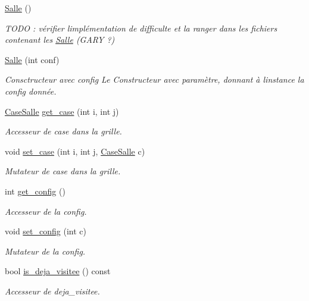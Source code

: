 \begin{DoxyCompactItemize}
\item 
\hyperlink{classSalle_a4cb05b76fb2b5430ac2bf903b8f75906}{Salle} ()
\begin{DoxyCompactList}\small\item\em T\+O\+DO \+: vérifier l\textquotesingle{}implémentation de difficulte et la ranger dans les fichiers contenant les \hyperlink{classSalle}{Salle} (G\+A\+RY ?) \end{DoxyCompactList}\item 
\hyperlink{classSalle_ad5b7cf5a8567b142dd3ed77b39480afb}{Salle} (int conf)
\begin{DoxyCompactList}\small\item\em Consctructeur avec {\itshape config} Le Constructeur avec paramètre, donnant à l\textquotesingle{}instance la {\itshape config} donnée. \end{DoxyCompactList}\item 
\hyperlink{classCaseSalle}{Case\+Salle} \hyperlink{classSalle_aae17412fe140b77d027fdc3553ecd33c}{get\+\_\+case} (int i, int j)
\begin{DoxyCompactList}\small\item\em Accesseur de case dans la grille. \end{DoxyCompactList}\item 
void \hyperlink{classSalle_ac0ce53372cead99268609aba57d0fff2}{set\+\_\+case} (int i, int j, \hyperlink{classCaseSalle}{Case\+Salle} c)
\begin{DoxyCompactList}\small\item\em Mutateur de case dans la grille. \end{DoxyCompactList}\item 
int \hyperlink{classSalle_a9268968ab5741a35da4e52399a4be0b7}{get\+\_\+config} ()
\begin{DoxyCompactList}\small\item\em Accesseur de la {\itshape config}. \end{DoxyCompactList}\item 
void \hyperlink{classSalle_a3d8b62393fd9cfa15bb385e187e72189}{set\+\_\+config} (int c)
\begin{DoxyCompactList}\small\item\em Mutateur de la {\itshape config}. \end{DoxyCompactList}\item 
bool \hyperlink{classSalle_aae34ded2001c65b0f3c8473d14c57471}{is\+\_\+deja\+\_\+visitee} () const 
\begin{DoxyCompactList}\small\item\em Accesseur de {\itshape deja\+\_\+visitee}. \end{DoxyCompactList}\item 

\end{DoxyCompactItemize}
